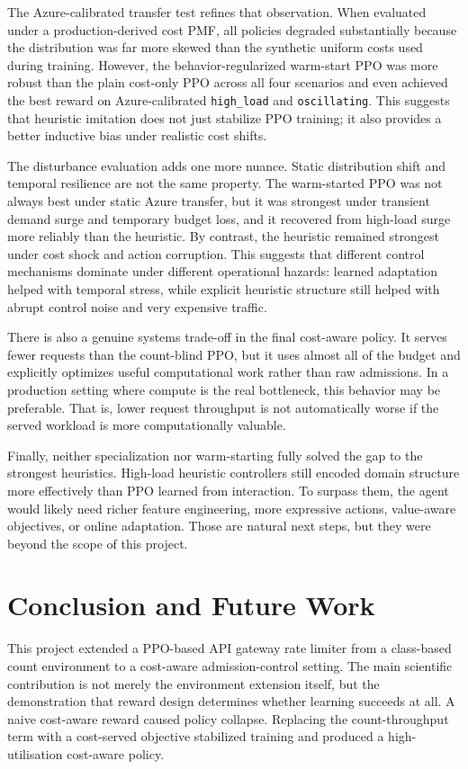 \documentclass[conference]{IEEEtran}
\begin{document}
The Azure-calibrated transfer test refines that observation. When evaluated under a production-derived cost PMF, all policies degraded substantially because the distribution was far more skewed than the synthetic uniform costs used during training. However, the behavior-regularized warm-start PPO was more robust than the plain cost-only PPO across all four scenarios and even achieved the best reward on Azure-calibrated \texttt{high\_load} and \texttt{oscillating}. This suggests that heuristic imitation does not just stabilize PPO training; it also provides a better inductive bias under realistic cost shifts.

The disturbance evaluation adds one more nuance. Static distribution shift and temporal resilience are not the same property. The warm-started PPO was not always best under static Azure transfer, but it was strongest under transient demand surge and temporary budget loss, and it recovered from high-load surge more reliably than the heuristic. By contrast, the heuristic remained strongest under cost shock and action corruption. This suggests that different control mechanisms dominate under different operational hazards: learned adaptation helped with temporal stress, while explicit heuristic structure still helped with abrupt control noise and very expensive traffic.

There is also a genuine systems trade-off in the final cost-aware policy. It serves fewer requests than the count-blind PPO, but it uses almost all of the budget and explicitly optimizes useful computational work rather than raw admissions. In a production setting where compute is the real bottleneck, this behavior may be preferable. That is, lower request throughput is not automatically worse if the served workload is more computationally valuable.

Finally, neither specialization nor warm-starting fully solved the gap to the strongest heuristics. High-load heuristic controllers still encoded domain structure more effectively than PPO learned from interaction. To surpass them, the agent would likely need richer feature engineering, more expressive actions, value-aware objectives, or online adaptation. Those are natural next steps, but they were beyond the scope of this project.

\section{Conclusion and Future Work}
This project extended a PPO-based API gateway rate limiter from a class-based count environment to a cost-aware admission-control setting. The main scientific contribution is not merely the environment extension itself, but the demonstration that reward design determines whether learning succeeds at all. A naive cost-aware reward caused policy collapse. Replacing the count-throughput term with a cost-served objective stabilized training and produced a high-utilisation cost-aware policy.
\end{document}
